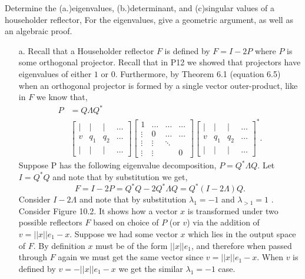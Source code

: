 \documentclass[12pt]{article}
\makeatletter
\theoremstyle{homework}
\newenvironment{exercise}[1]
{\def\@currentlabel{#1}\exercisecore}
{\endexercisecore}
\makeatother
\begin{document}
\vspace{1in}


\begin{exercise}{10.1} Determine the (a.)eigenvalues, (b.)determinant, and (c)singular values of a householder reflector, 
  For the eigenvalues, give a geometric argument, as well as an algebraic proof.\\
  \begin{enumerate}
    \item[a.] Recall that a Householder reflector $F$ is defined by $F = I - 2P$ where $P$ is some orthogonal projector.
    Recall that in P12 we showed that projectors have eigenvalues of either $1$ or $0$. Furthermore, by Theorem 6.1 (equation 6.5) when an orthogonal projector is formed by 
    a single vector outer-product, like in $F$ we know that, 
    \begin{align*}
      P &=  Q\Lambda Q^*\\
        &\begin{bmatrix}
          \vert & \vert & \vert & \dots\\
          v     & q_1     & q_2 & \dots\\
          \vert & \vert & \vert & \dots
      \end{bmatrix}
        \begin{bmatrix} 
         1 & \dots & \dots & \dots \\
         \vdots & 0 & \dots & \dots \\
         \vdots & \vdots & \ddots & \\
         \vdots&\vdots &        & 0 
      \end{bmatrix}
      \begin{bmatrix}
        \vert & \vert & \vert& \dots \\
        v     & q_1     & q_2& \dots  \\
        \vert & \vert & \vert& \dots
    \end{bmatrix}^*.
    \end{align*} 
    Suppose P has the following eigenvalue decomposition, $P =  Q^*\Lambda Q$. Let $I =   Q^* Q$ and note that by substitution we get, 
    \begin{equation*}
      F = I - 2P =  Q^* Q - 2 Q^*\Lambda  Q =   Q^*(I - 2\Lambda) Q.
    \end{equation*}
    Consider $I - 2\Lambda$ and note that by substitution $\lambda_1 = -1$ and $\lambda_{>1} = 1$ .\\
    Consider Figure 10.2. It shows how a vector $x$ is transformed under two possible reflectors $F$ based on choice of $P$ (or $v$) via the 
    addition of $v = ||x||e_1 - x$. Suppose we had some vector $x$ which lies in the output space of $F$. By definition $x$ must 
    be of the form $||x||e_1$, and therefore when passed through $F$ again we must get the same vector since $v = ||x||e_1 - x$. When $v$ is defined 
    by $v = -||x||e_1 - x$ we get the similar $\lambda_1 = -1$ case. 
    \vspace{.15in}


\end{enumerate}
\end{exercise}
\end{document}
